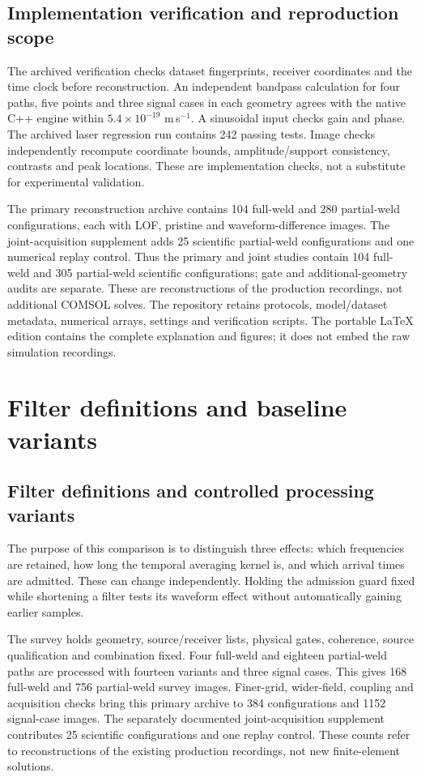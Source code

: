 \documentclass[11pt]{article}
\begin{document}
\subsection{Implementation verification and reproduction scope}
The archived verification checks dataset fingerprints, receiver coordinates
and the time clock before reconstruction. An independent bandpass calculation
for four paths, five points and three signal cases in each geometry agrees
with the native C++ engine within $5.4\times10^{-19}$ m\,s$^{-1}$.
A sinusoidal input checks gain and phase. The archived laser regression run
contains 242 passing tests. Image checks independently recompute coordinate
bounds, amplitude/support consistency, contrasts and peak locations. These
are implementation checks, not a substitute for experimental validation.

The primary reconstruction archive contains 104 full-weld and 280
partial-weld configurations, each with LOF, pristine and waveform-difference
images. The joint-acquisition supplement adds 25 scientific partial-weld
configurations and one numerical replay control. Thus the primary and joint
studies contain 104 full-weld and 305 partial-weld scientific configurations;
gate and additional-geometry audits are separate. These are reconstructions
of the production recordings, not additional COMSOL solves. The repository
retains protocols, model/dataset metadata, numerical arrays, settings and
verification scripts. The portable LaTeX edition contains the complete
explanation and figures; it does not embed the raw simulation recordings.


\section{Filter definitions and baseline variants}
\subsection{Filter definitions and controlled processing variants}\label{saft:archive:shared:filter_details}
The purpose of this comparison is to distinguish three effects: which frequencies are retained, how long the temporal averaging kernel is, and which arrival times are admitted. These can change independently. Holding the admission guard fixed while shortening a filter tests its waveform effect without automatically gaining earlier samples.

The survey holds geometry, source/receiver lists, physical gates, coherence, source qualification and combination fixed. Four full-weld and eighteen partial-weld paths are processed with fourteen variants and three signal cases. This gives 168 full-weld and 756 partial-weld survey images. Finer-grid, wider-field, coupling and acquisition checks bring this primary archive to 384 configurations and 1152 signal-case images. The separately documented joint-acquisition supplement contributes 25 scientific configurations and one replay control. These counts refer to reconstructions of the existing production recordings, not new finite-element solutions.
\end{document}

